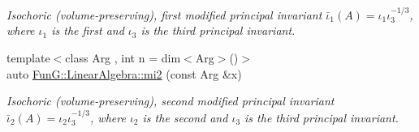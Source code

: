\begin{DoxyCompactItemize}
\begin{DoxyCompactList}\small\item\em Isochoric (volume-\/preserving), first modified principal invariant $ \bar\iota_1(A)=\iota_1\iota_3^{-1/3} $, where $\iota_1$ is the first and $\iota_3$ is the third principal invariant. \end{DoxyCompactList}\item 
{\footnotesize template$<$class Arg , int n = dim$<$\+Arg$>$()$>$ }\\auto \hyperlink{group__InvariantGroup_ga9d219c5c48cce1d3af60345916963524}{Fun\+G\+::\+Linear\+Algebra\+::mi2} (const Arg \&x)
\begin{DoxyCompactList}\small\item\em Isochoric (volume-\/preserving), second modified principal invariant $ \bar\iota_2(A)=\iota_2\iota_3^{-1/3} $, where $\iota_2$ is the second and $\iota_3$ is the third principal invariant. \end{DoxyCompactList}\end{DoxyCompactItemize}
